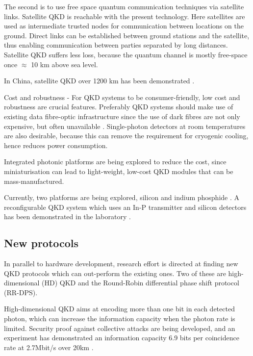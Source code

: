 The second is to use free space quantum communication techniques via satellite links. Satellite QKD is reachable with the present technology. Here satellites are used as intermediate trusted nodes for communication between locations on the ground. Direct links can be established between ground stations and the satellite, thus enabling communication between parties separated by long distances. Satellite QKD suffers less loss, because the quantum channel is mostly free-space once $\approx$ 10 km above sea level.

In China, satellite QKD over 1200 km has been demonstrated \cite{bib:liao2017satellite}.

Cost and robustness - 
For QKD systems to be consumer-friendly, low cost and robustness are crucial features. Preferably QKD systems should make use of existing data fibre-optic infrastructure since the use of dark fibres are not only expensive, but often unavailable \cite{bib:diamanti2016practical}. Single-photon detectors at room temperatures are also desirable,  because this can remove the requirement for cryogenic cooling, hence reduces power consumption.

Integrated photonic platforms are being explored to reduce the cost, since miniaturisation can lead to light-weight, low-cost QKD modules that can be mass-manufactured. 

Currently, two platforms are being explored, silicon \cite{bib:lim2014review} and indium phosphide \cite{bib:smit2014introduction}. A reconfigurable QKD system which uses an In-P transmitter and silicon detectors has been demonstrated in the laboratory \cite{bib:sibson2017chip}.

\subsection{New protocols}

In parallel to hardware development, research effort is directed at finding new QKD protocols which can out-perform the existing ones. Two of these are high-dimensional (HD) QKD and the Round-Robin differential phase shift protocol (RR-DPS).

High-dimensional QKD aims at encoding more than one bit in each detected photon, which can increase the information capacity when the photon rate is limited. Security proof against collective attacks are being developed, and an experiment has demonstrated an information capacity 6.9 bits per coincidence rate at 2.7Mbit/s over 20km \cite{bib:zhong2015photon}.

